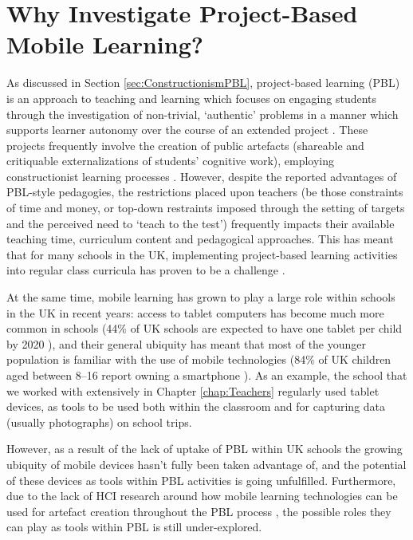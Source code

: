 \section{Why Investigate Project-Based Mobile Learning?}
As discussed in Section \ref{sec:ConstructionismPBL}, project-based learning (PBL) is an approach to teaching and learning which focuses on engaging students through the investigation of non-trivial, `authentic' problems in a manner which supports learner autonomy over the course of an extended project \citep{Blumenfeld1991}. These projects frequently involve the creation of public artefacts (shareable and critiquable externalizations of students' cognitive work), employing constructionist learning processes \citep{Papert1991, Holubova2008}. However, despite the reported advantages of PBL-style pedagogies, the restrictions placed upon teachers (be those constraints of time and money, or top-down restraints imposed through the setting of targets and the perceived need to `teach to the test') frequently impacts their available teaching time, curriculum content and pedagogical approaches. This has meant that for many schools in the UK, implementing project-based learning activities into regular class curricula has proven to be a challenge \citep{TheEducationEndowmentFoundation2016}.

At the same time, mobile learning has grown to play a large role within schools in the UK in recent years: access to tablet computers has become much more common in schools (44\% of UK schools are expected to have one tablet per child by 2020 \citep{BritishEducationalSuppliersAssociation2015}), and their general ubiquity has meant that most of the younger population is familiar with the use of mobile technologies (84\% of UK children aged between 8--16 report owning a smartphone \citep{Statistica2018a}). As an example, the school that we worked with extensively in Chapter \ref{chap:Teachers} regularly used tablet devices, as tools to be used both within the classroom and for capturing data (usually photographs) on school trips.

However, as a result of the lack of uptake of PBL within UK schools the growing ubiquity of mobile devices hasn't fully been taken advantage of, and the potential of these devices as tools within PBL activities is going unfulfilled. Furthermore, due to the lack of HCI research around how mobile learning technologies can be used for artefact creation throughout the PBL process \citep{Chan2015}, the possible roles they can play as tools within PBL is still under-explored.


